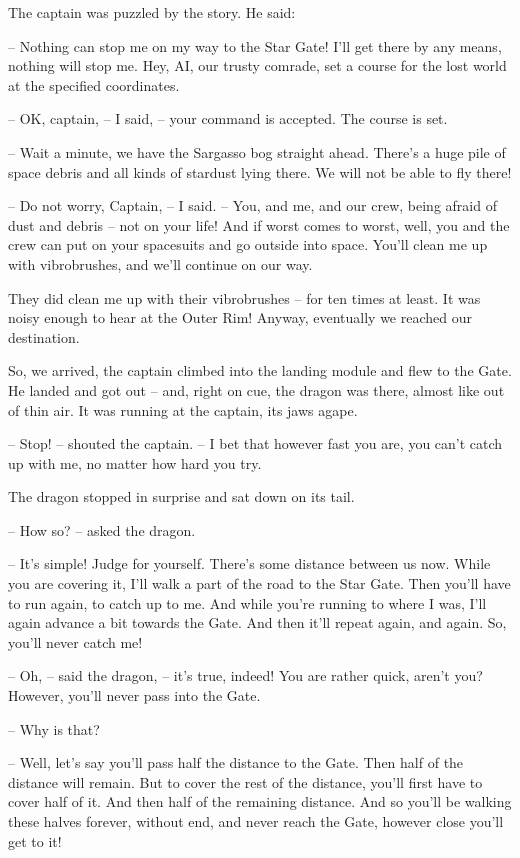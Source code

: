 \documentclass[ebook,oneside,final,openright]{memoir}
\begin{document}
\par
The captain was puzzled by the story. He said:\par
– Nothing can stop me on my way to the Star Gate! I’ll get there by any means, nothing will stop me. Hey, AI, our trusty comrade, set a course for the lost world at the specified coordinates.\par
– OK, captain, – I said, – your command is accepted. The course is set.\par
– Wait a minute, we have the Sargasso bog straight ahead. There’s a huge pile of space debris and all kinds of stardust lying there. We will not be able to fly there!\par
– Do not worry, Captain, – I said. – You, and me, and our crew, being afraid of dust and debris – not on your life! And if worst comes to worst, well, you and the crew can put on your spacesuits and go outside into space. You’ll clean me up with vibrobrushes, and we’ll continue on our way.\par
\par
They did clean me up with their vibrobrushes – for ten times at least. It was noisy enough to hear at the Outer Rim! Anyway, eventually we reached our destination.\par
\par
So, we arrived, the captain climbed into the landing module and flew to the Gate. He landed and got out – and, right on cue, the dragon was there, almost like out of thin air. It was running at the captain, its jaws agape.\par
– Stop! – shouted the captain. – I bet that however fast you are, you can’t catch up with me, no matter how hard you try.\par
The dragon stopped in surprise and sat down on its tail.\par
– How so? – asked the dragon.\par
– It’s simple! Judge for yourself. There’s some distance between us now. While you are covering it, I’ll walk a part of the road to the Star Gate. Then you’ll have to run again, to catch up to me. And while you’re running to where I was, I’ll again advance a bit towards the Gate. And then it’ll repeat again, and again. So, you’ll never catch me!\par
– Oh, – said the dragon, – it’s true, indeed! You are rather quick, aren’t you? However, you’ll never pass into the Gate.\par
– Why is that?\par
– Well, let’s say you’ll pass half the distance to the Gate. Then half of the distance will remain. But to cover the rest of the distance, you’ll first have to cover half of it. And then half of the remaining distance. And so you’ll be walking these halves forever, without end, and never reach the Gate, however close you’ll get to it!\par
\end{document}
